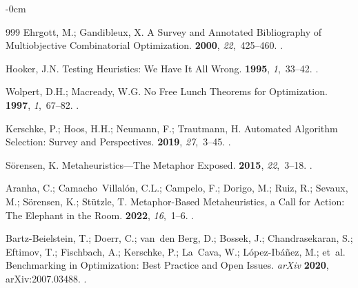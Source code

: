 \documentclass[systems,article,accept,moreauthors,pdftex]{Definitions/mdpi}
\begin{document}
\begin{adjustwidth}{-\extralength}{0cm}
\begin{thebibliography}{999}
Ehrgott, M.; Gandibleux, X.
\newblock A Survey and Annotated Bibliography of Multiobjective Combinatorial
  Optimization.
 {\bf 2000}, {\em 22},~425--460.
.

Hooker, J.N.
\newblock Testing Heuristics: We Have It All Wrong.
 {\bf 1995}, {\em 1},~33--42.
.

Wolpert, D.H.; Macready, W.G.
\newblock No Free Lunch Theorems for Optimization.
 {\bf 1997}, {\em
  1},~67--82.
.

Kerschke, P.; Hoos, H.H.; Neumann, F.; Trautmann, H.
\newblock Automated Algorithm Selection: Survey and Perspectives.
 {\bf 2019}, {\em 27},~3--45.
.

S{\"o}rensen, K.
\newblock Metaheuristics---The Metaphor Exposed.
 {\bf 2015},
  {\em 22},~3--18.
.

Aranha, C.; Camacho~Villal{\'o}n, C.L.; Campelo, F.; Dorigo, M.; Ruiz, R.;
  Sevaux, M.; S{\"o}rensen, K.; St{\"u}tzle, T.
\newblock Metaphor-Based Metaheuristics, a Call for Action: The Elephant in the
  Room.
 {\bf 2022}, {\em 16},~1--6.
.

Bartz-Beielstein, T.; Doerr, C.; van~den Berg, D.; Bossek, J.; Chandrasekaran,
  S.; Eftimov, T.; Fischbach, A.; Kerschke, P.; La~Cava, W.;
  L{\'o}pez-Ib{\'a}{\~n}ez, M.;  et~al.
\newblock Benchmarking in Optimization: Best Practice and Open Issues.
\newblock \emph{arXiv} \textbf{2020}, arXiv:2007.03488.
.


\end{thebibliography}
\end{adjustwidth}
\end{document}
